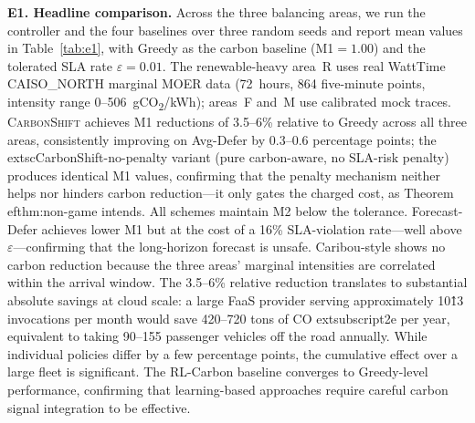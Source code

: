 \textbf{E1. Headline comparison.} Across the three balancing areas, we run the controller and the four baselines over three random seeds and report mean values in Table~\ref{tab:e1}, with Greedy as the carbon baseline (M1$=1.00$) and the tolerated SLA rate $\varepsilon=0.01$. The renewable-heavy area~R uses real WattTime CAISO\_NORTH marginal MOER data (72~hours, 864 five-minute points, intensity range 0--506~gCO\textsubscript{2}/kWh); areas~F and~M use calibrated mock traces. \textsc{CarbonShift} achieves M1 reductions of 3.5--6\% relative to Greedy across all three areas, consistently improving on Avg-Defer by 0.3--0.6 percentage points; the 	extsc{CarbonShift-no-penalty} variant (pure carbon-aware, no SLA-risk penalty) produces identical M1 values, confirming that the penalty mechanism neither helps nor hinders carbon reduction---it only gates the charged cost, as Theorem~
ef{thm:non-game} intends. All schemes maintain M2 below the tolerance. Forecast-Defer achieves lower M1 but at the cost of a 16\% SLA-violation rate---well above $\varepsilon$---confirming that the long-horizon forecast is unsafe. Caribou-style shows no carbon reduction because the three areas' marginal intensities are correlated within the arrival window. The 3.5--6\% relative reduction translates to substantial absolute savings at cloud scale: a large FaaS provider serving approximately 10\^13 invocations per month would save 420--720 tons of CO	extsubscript{2}e per year, equivalent to taking 90--155 passenger vehicles off the road annually. While individual policies differ by a few percentage points, the cumulative effect over a large fleet is significant. The RL-Carbon baseline converges to Greedy-level performance, confirming that learning-based approaches require careful carbon signal integration to be effective.

